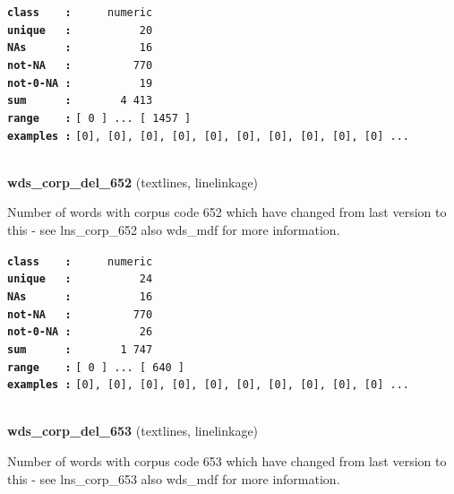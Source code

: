 \documentclass[]{article}
\begin{document}
\textbf{\texttt{class\ \ \ \ :}} \texttt{~~~~~numeric}\\
\textbf{\texttt{unique\ \ \ :}} \texttt{~~~~~~~~~~20}\\
\textbf{\texttt{NAs\ \ \ \ \ \ :}} \texttt{~~~~~~~~~~16}\\
\textbf{\texttt{not-NA\ \ \ :}} \texttt{~~~~~~~~~770}\\
\textbf{\texttt{not-0-NA\ :}} \texttt{~~~~~~~~~~19}\\
\textbf{\texttt{sum\ \ \ \ \ \ :}} \texttt{~~~~~~~4~413}\\
\textbf{\texttt{range\ \ \ \ :}}
\texttt{{[}\ 0\ {]}\ ...\ {[}\ 1457\ {]}}\\
\textbf{\texttt{examples\ :}}
\texttt{{[}0{]},\ {[}0{]},\ {[}0{]},\ {[}0{]},\ {[}0{]},\ {[}0{]},\ {[}0{]},\ {[}0{]},\ {[}0{]},\ {[}0{]}\ ...}\\

~

\textbf{wds\_corp\_del\_652} (textlines, linelinkage)

Number of words with corpus code 652 which have changed from last
version to this - see lns\_corp\_652 also wds\_mdf for more information.

\textbf{\texttt{class\ \ \ \ :}} \texttt{~~~~~numeric}\\
\textbf{\texttt{unique\ \ \ :}} \texttt{~~~~~~~~~~24}\\
\textbf{\texttt{NAs\ \ \ \ \ \ :}} \texttt{~~~~~~~~~~16}\\
\textbf{\texttt{not-NA\ \ \ :}} \texttt{~~~~~~~~~770}\\
\textbf{\texttt{not-0-NA\ :}} \texttt{~~~~~~~~~~26}\\
\textbf{\texttt{sum\ \ \ \ \ \ :}} \texttt{~~~~~~~1~747}\\
\textbf{\texttt{range\ \ \ \ :}}
\texttt{{[}\ 0\ {]}\ ...\ {[}\ 640\ {]}}\\
\textbf{\texttt{examples\ :}}
\texttt{{[}0{]},\ {[}0{]},\ {[}0{]},\ {[}0{]},\ {[}0{]},\ {[}0{]},\ {[}0{]},\ {[}0{]},\ {[}0{]},\ {[}0{]}\ ...}\\

~

\textbf{wds\_corp\_del\_653} (textlines, linelinkage)

Number of words with corpus code 653 which have changed from last
version to this - see lns\_corp\_653 also wds\_mdf for more information.
\end{document}
